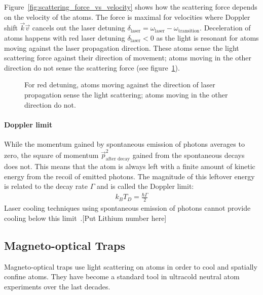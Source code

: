 Figure~\ref{fig:scattering_force_vs_velocity} shows how the scattering force depends on the velocity of the atoms. The force is maximal for velocities where Doppler shift $\vec k \vec v$ cancels out the laser detuning $\delta_\text{laser} = \omega_\text{laser} - \omega_\text{transition}$. Deceleration of atoms happens with red laser detuning $\delta_\text{laser} < 0$ as the light is resonant for atoms moving against the laser propagation direction. These atoms sense the light scattering force against their direction of movement; atoms moving in the other direction do not sense the scattering force (see figure~\ref{fig:scattering_force_detuning}).

\begin{figure}
    \caption{For red detuning, atoms moving against the direction of laser propagation sense the light scattering; atoms moving in the other direction do not.}\label{fig:scattering_force_detuning}
\end{figure}

\paragraph*{Doppler limit} While the momentum gained by spontaneous emission of photons averages to zero, the square of momentum $\vec p_\text{after decay}^2$ gained from the spontaneous decays does not. This means that the atom is always left with a finite amount of kinetic energy from the recoil of emitted photons. The magnitude of this leftover energy is related to the decay rate $\Gamma$ and is called the Doppler limit:
\begin{align}
    k_B T_D = \frac{\hbar \Gamma}{2}
\end{align}
Laser cooling techniques using spontaneous emission of photons cannot provide cooling below this limit~\cite{foot_atomic_2005}.[Put Lithium number here] 


\subsection*{Magneto-optical Traps}
Magneto-optical traps use light scattering on atoms in order to cool and spatially confine atoms. They have become a standard tool in ultracold neutral atom experiments over the last decades.

